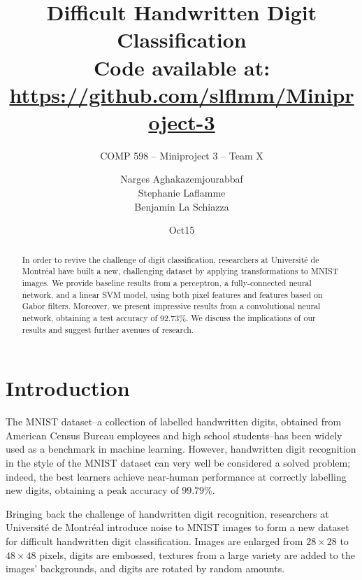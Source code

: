 \documentclass{acm_proc_article-sp}
\begin{document}
\title{Difficult Handwritten Digit Classification \\
{\normalsize Code available at: \url{https://github.com/slflmm/Miniproject-3}}} 
\subtitle{COMP 598 -- Miniproject 3 -- Team X}

\author{
\alignauthor 
Narges Aghakazemjourabbaf\\
\alignauthor
Stephanie Laflamme\\
\alignauthor Benjamin La Schiazza\\
}

\date{Oct15}



\maketitle
\begin{abstract}
In order to revive the challenge of digit classification, researchers at  Universit\'{e} de Montr\'{e}al have built a new, challenging dataset by applying transformations to MNIST images. We provide baseline results from a perceptron, a fully-connected neural network, and a linear SVM model, using both pixel features and features based on Gabor filters. Moreover, we present impressive results from a convolutional neural network, obtaining a test accuracy of 92.73\%. We discuss the implications of our results and suggest further avenues of research.
\end{abstract}

\section{Introduction}%
The MNIST dataset--a collection of labelled handwritten digits, obtained from American Census Bureau employees and high school students\cite{LeCun2}--has been widely used as a benchmark in machine learning. However, handwritten digit recognition in the style of the MNIST dataset can very well be considered a solved problem; indeed, the best learners achieve near-human performance at correctly labelling new digits\cite{Ciresan}, obtaining a peak accuracy of $99.79\%$\cite{Wan}.

Bringing back the challenge of handwritten digit recognition, researchers at Universit\'{e} de Montr\'{e}al introduce noise to MNIST images to form a new dataset for difficult handwritten digit classification. Images are enlarged from $28\times28$ to $48\times48$ pixels, digits are embossed, textures from a large variety are added to the images' backgrounds, and digits are rotated by random amounts.
\end{document}

